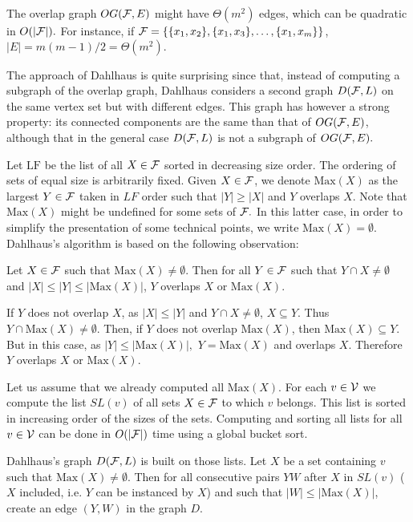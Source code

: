 \documentclass{llncs}
\begin{document}
The overlap graph $OG({\cal F},E)$ might have $\Theta(m^2)$ edges,
which can be quadratic in $O(|{\cal F}|).$ For instance, if ${\cal F}
=\{\{x_1,x_2\}, \{x_1,x_3\}, \ldots, \{x_1,x_m\}\}$,
$|E|=m(m-1)/2=\Theta(m^2).$

The approach of Dahlhaus is quite surprising since that, instead of
computing a subgraph of the overlap graph, Dahlhaus considers
a second graph $D({\cal F},L)$ on the same vertex set but with
different edges. This graph has however a strong property: its
connected components are the same than that of $OG({\cal F},E)$,
although that in the general case $D({\cal F},L)$ is not a subgraph
of $OG({\cal F},E).$
 
Let $\mbox{LF}$ be the list of all $X \in {\cal F}$ sorted in
decreasing size order. The ordering of sets of equal size is arbitrarily
fixed. Given $X \in {\cal F}$, we denote $\mbox{Max}(X)$ as the largest
$Y \in {\cal F}$ taken in $LF$ order such that $|Y| \geq |X|$ and $Y$
overlaps $X$. Note that $\mbox{Max}(X)$ might be undefined for some
sets of ${\cal F}.$ In this latter case, in order to simplify the
presentation of some technical points, we write
$\mbox{Max}(X)=\emptyset.$ Dahlhaus's algorithm is based on the
following observation:

\begin{lemma}
\label{thelemma}
Let $X \in {\cal F}$ such that $\mbox{Max}(X)\not=\emptyset$. Then for
all $Y \in {\cal F}$ such that $Y \cap X \neq \emptyset$ and $ |X|
\leq |Y| \leq |\mbox{Max}(X)|$, $Y$ overlaps $X$ or $\mbox{Max}(X).$
\end{lemma}
\begin{preuve}
If $Y$ does not overlap $X$, as $|X| \leq |Y|$ and $Y \cap X \neq
\emptyset$, $X \subseteq Y.$ Thus $Y \cap \mbox{Max}(X) \neq
\emptyset.$ Then, if $Y$ does not overlap $\mbox{Max}(X)$, then
$\mbox{Max}(X) \subseteq Y$. But in this case, as $|Y| \leq
|\mbox{Max}(X)|,$ $Y=\mbox{Max}(X)$ and overlaps $X$. Therefore $Y$
overlaps $X$ or $\mbox{Max}(X).$
\end{preuve}

Let us assume that we already computed all $\mbox{Max}(X).$ For each
$v \in {\cal V}$ we compute the list $SL(v)$ of all sets $X \in {\cal
  F}$ to which $v$ belongs. This list is sorted in increasing order of
the sizes of the sets. Computing and sorting all lists for all $v\in
{\cal V}$ can be done in $O(|{\cal F}|)$ time using a global bucket
sort.

Dahlhaus's graph $D({\cal F},L)$ is built on those lists. Let $X$ be a set
containing $v$ such that $\mbox{Max}(X)\not=\emptyset$. Then for all
consecutive pairs $YW$ after $X$ in $SL(v)$ ($X$ included, i.e. $Y$
can be instanced by $X$) and such that $|W|\leq |\mbox{Max}(X)|$,
create an edge $(Y,W)$ in the graph $D$.
\end{document}
